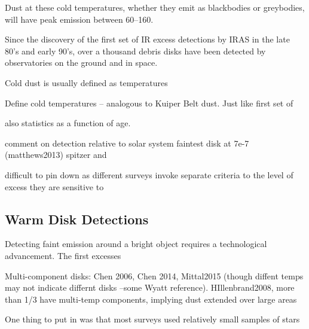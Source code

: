    Dust at these cold temperatures, whether they emit as blackbodies or greybodies, will have peak emission between 60--160\micron. 
   
   
   Since the discovery of the first set of IR excess detections by IRAS in the late 80's and early 90's, over a thousand debris disks have been detected by observatories on the ground and in space.
   
   Cold dust is usually defined as temperatures
   
   Define cold temperatures -- analogous to Kuiper Belt dust. Just like first set of  
   
   also statistics as a function of age.
   
   comment on detection relative to solar system
   faintest disk at 7e-7 (matthews2013)
   spitzer and 
   
   difficult to pin down as different surveys invoke separate criteria to the level of excess they are sensitive to
   
   \subsection{Warm Disk Detections}
   
   
    
    Detecting faint emission around a bright object requires a technological advancement. The first excesses
    
Multi-component disks: Chen 2006, Chen 2014, Mittal2015 (though diffent temps may not indicate differnt disks --some Wyatt reference). HIllenbrand2008, more than 1/3 have multi-temp components, implying dust extended over large areas

One thing to put in was that most surveys used relatively small samples of stars